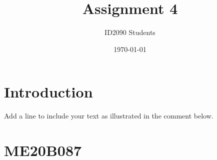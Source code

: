 \documentclass[a4paper, 12pt]{article}
\begin{document}
\title{Assignment 4}
\author{ID2090 Students}
\date{\today}
\maketitle

\tableofcontents

\section{Introduction}
Add a line to include your text as illustrated in the comment below.

% 

\section{ME20B087}

\end{document}
